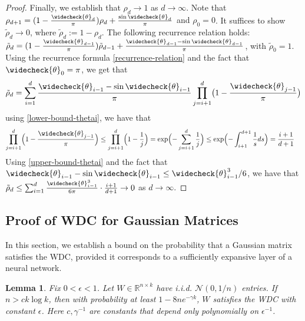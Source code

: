 \documentclass[11pt]{article}
\newtheorem{lemma}[theorem]{Lemma}
\newcommand{\R}{\mathbb{R}}
\newcommand{\eps}{\epsilon}
\newcommand{\rhotilde}{\tilde{\rho}}
\newcommand{\thetacheck}{\widecheck{\theta}}
\newcommand{\calN}{\mathcal{N}}
\newcommand{\red}[1]{{\color{black} #1}}
\begin{document}
\begin{proof}
Finally, we establish that $\rho_d\to 1$ as $d \to \infty$.  Note that $\rho_{d+1} = (1 - \frac{\thetacheck_d}{\pi}) \rho_d + \frac{\sin \thetacheck_d}{\pi}$ \red{ and $\rho_0 = 0$}.  It suffices to show $\rhotilde_d \to 0$, where $\rhotilde_d := 1 - \rho_d$.  \red{The following recurrence relation holds: $\rhotilde_d = (1 - \frac{\thetacheck_{d-1}}{\pi}) \rhotilde_{d-1} + \frac{\thetacheck_{d-1} - \sin \thetacheck_{d-1}}{\pi}$, with $\rhotilde_0=1$. } Using the recurrence formula \eqref{recurrence-relation} \red{ and the fact that $\thetacheck_0=\pi$}, we get that 
\begin{align}
\rhotilde_d =  \sum_{i=1}^d \frac{\thetacheck_{\red{i}-1} - \sin \thetacheck_{\red{i}-1}}{\pi} \prod_{j=i+1}^d \bigl(1 - \frac{\thetacheck_{\red{j}-1}}{\pi} \bigr)
\end{align}
using \eqref{lower-bound-thetai}, we have that
\begin{align*}
\prod_{j=i+1}^d \Bigl(1 - \frac{\thetacheck_{\red{j}-1}}{\pi} \Bigr) &\leq \prod_{j=i+1}^d \Bigl(1 - \frac{1}{\red{j}} \Bigr)
= \exp \Bigl( -\sum_{j = i+1}^d \frac{1}{\red{j}}  \Bigr) \leq \exp \Bigl( - \int_{i+1}^{d+1} \frac{1}{\red{s}} ds  \Bigr) = \frac{i+\red{1}}{d+\red{1}}
\end{align*}
Using \eqref{upper-bound-thetai} and the fact that $\thetacheck_{\red{i}-1} - \sin \thetacheck_{\red{i}-1} \leq \thetacheck_{\red{i}-1}^3 / 6$, we have that $\rhotilde_d \leq \sum_{i=1}^d \frac{\thetacheck_{\red{i}-1}^3}{6\pi}\cdot  \frac{i+\red{1}}{d+\red{1}} \to 0$ as $d \to \infty$. 


\end{proof}



\subsection{Proof of WDC for Gaussian Matrices} \label{sec:WDC-Gaussian}

In this section, we establish a bound on the probability that a Gaussian matrix satisfies the WDC, provided it corresponds to a sufficiently expansive layer of a neural network.  \begin{lemma} \label{lemma:isometry-apxtapx-uniform} 
Fix $0 < \eps < 1$.  Let $W \in \R^{n \times k}$ have i.i.d. $\calN(0, 1/n)$ entries.   If $n > c k \log k$, then with probability at least $1- 8 n e^{-\gamma k}$, $W$ satisfies the WDC with constant $\eps$. Here $c, \gamma^{-1}$ are constants that depend only polynomially on $\eps^{-1}$. 
\end{lemma}
\end{document}
